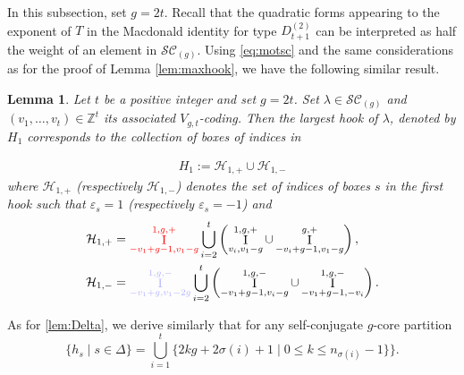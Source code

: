 \documentclass[11pt,letterpaper]{amsart}
\def\bbbz{\mathbb Z}
\def\cch{\mathcal H}
\def\ccsc{\mathcal {SC}}
\newtheorem{lm}[df]{Lemma}
\DeclareMathOperator{\I}{I}
\numberwithin{equation}{section}
\numberwithin{df}{section}
\begin{document}
In this subsection, set $g=2t$. Recall that the quadratic forms appearing to the exponent of $T$ in the Macdonald identity for type $D^{(2)}_{t+1}$ can be interpreted as half the weight of an element in $\ccsc_{(g)}$.
Using \eqref{eq:motsc} and the same considerations as for the proof of Lemma \ref{lem:maxhook}, we have the following similar result.
\begin{lm}\label{lem:maxhooksc}
Let $t$ be a positive integer and set $g=2t$. Set $\lambda\in \ccsc_{(g)}$ and $(v_1,\dots,v_{t})\in\bbbz^t$ its associated $V_{g,t}$-coding. Then the largest hook of $\lambda$, denoted by $H_1$ corresponds to the collection of boxes of indices in

\begin{align*}
H_1:=\cch_{1,+}\cup\cch_{1,-}
\end{align*}
where $\cch_{1,+}$ (respectively $\cch_{1,-}$) denotes the set of indices of boxes $s$ in the first hook such that $\varepsilon_s=1$ (respectively $\varepsilon_s=-1$) and
\begin{align*}
\cch_{1,+}&=\textcolor{red}{\I_{-v_1+g-1,v_1-g}^{1,g,+}} \displaystyle\bigcup_{i=2}^{t}\left(\I_{v_i,v_1-g}^{1,g,+}\cup \I_{-v_i+g-1,v_1-g}^{g,+}\right),\\
\cch_{1,-}&= \textcolor{blue!30}{\I_{-v_1+g,v_1-2g}^{1,g,-}} \displaystyle\bigcup_{i=2}^{t}\left(\I_{-v_1+g-1,v_i-g}^{1,g,-}\cup \I_{-v_1+g-1,-v_i}^{1,g,-}\right).
\end{align*}

\end{lm}

As for \eqref{lem:Delta}, we derive similarly that for any self-conjugate $g$-core partition
\begin{equation}\label{lem:Deltasc}
\lbrace h_s\mid s\in\Delta\rbrace=\bigcup_{i=1}^{t}\lbrace 2kg+2\sigma(i)+1	\mid  0\leq k\leq n_{\sigma(i)}-1\rbrace\rbrace.
\end{equation}
\end{document}
